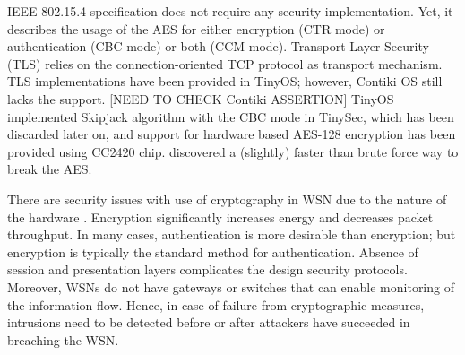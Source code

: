 \documentclass[conference,man]{IEEEtran}
\begin{document}
IEEE 802.15.4 specification does not require any security implementation. 
Yet, it describes the usage of the AES for either encryption (CTR mode) or authentication (CBC mode) or both (CCM-mode).
Transport Layer Security (TLS) relies on the connection-oriented TCP protocol as transport mechanism.  
TLS implementations have been provided in TinyOS; however, Contiki OS still lacks the support. [NEED TO CHECK Contiki ASSERTION]
TinyOS implemented Skipjack algorithm with the CBC mode in TinySec, which has been discarded later on, and support for  hardware based AES-128 encryption has been provided using CC2420 chip.
\cite{ISI:000308844100019}  discovered a (slightly) faster than brute force way to break the AES.  %

There are security issues with use of cryptography in WSN due to the nature of the hardware \cite{1710}.
Encryption significantly increases energy and decreases packet throughput.
In many cases, authentication is more desirable than encryption; but encryption is typically the standard method for authentication.
Absence of session and presentation layers complicates the design security protocols.  %
Moreover, WSNs do not have gateways or switches that can enable monitoring of the information flow.
Hence, in case of failure from cryptographic measures, intrusions need to be detected before or after attackers have succeeded in breaching the WSN. 
\end{document}
